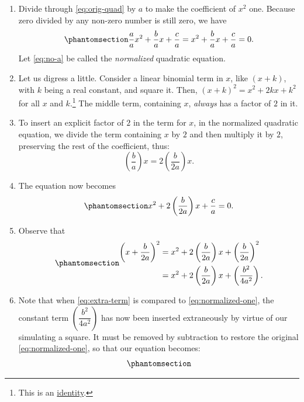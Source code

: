 \documentclass[
  a4paper,
]{article}
\begin{document}
\begin{enumerate}
\item
  Divide through \cref{eq:orig-quad} by \(a\) to make the coefficient of
  \(x^2\) one. Because zero divided by any non-zero number is still
  zero, we have \begin{equation}\phantomsection\label{eq:no-a}{
  \frac{a}{a}x^2 + \frac{b}{a}x + \frac{c}{a} = x^2 + \frac{b}{a}x + \frac{c}{a} = 0.
  }\end{equation} Let \cref{eq:no-a} be called the \emph{normalized}
  quadratic equation.
\item
  Let us digress a little. Consider a linear binomial term in \(x\),
  like \((x + k)\), with \(k\) being a real constant, and square it.
  Then, \((x + k)^2 = x^2 + 2kx + k^2\) for all \(x\) and
  \(k\).\footnote{This is an \hyperref[identities]{identity}.} The
  middle term, containing \(x\), \emph{always} has a factor of \(2\) in
  it.
\item
  To insert an explicit factor of \(2\) in the term for \(x\), in the
  normalized quadratic equation, we divide the term containing \(x\) by
  \(2\) and then multiply it by \(2\), preserving the rest of the
  coefficient, thus: \[
  \left(\frac{b}{a}\right)x = 2\left(\frac{b}{2a}\right)x.
  \]
\item
  The equation now becomes
  \begin{equation}\phantomsection\label{eq:normalized-one}{
  x^2 + 2\left(\frac{b}{2a}\right)x + \frac{c}{a} = 0.
  }\end{equation}
\item
  Observe that \begin{equation}\phantomsection\label{eq:extra-term}{
  \begin{aligned}
  \left(x + \frac{b}{2a}\right)^2 &= x^2 + 2\left(\frac{b}{2a}\right)x + \left(\frac{b}{2a}\right)^2\\
  &= x^2 + 2\left(\frac{b}{2a}\right)x + \left(\frac{b^2}{4a^2}\right).
  \end{aligned}
  }\end{equation}
\item
  Note that when \cref{eq:extra-term} is compared to
  \cref{eq:normalized-one}, the constant term
  \(\left(\dfrac{b^2}{4a^2}\right)\) has now been inserted extraneously
  by virtue of our simulating a square. It must be removed by
  subtraction to restore the original \cref{eq:normalized-one}, so that
  our equation becomes:
  \begin{equation}\phantomsection\label{eq:quad-formula}{
  \begin{aligned}

\end{aligned}}
\end{equation}
\end{enumerate}
\end{document}
